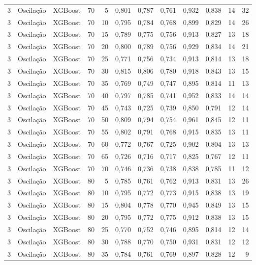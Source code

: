 \begin{longtable}{ccclrrrrrrrr}
3 & Oscilação & XGBoost & 70 & 5 & 0,801 & 0,787 & 0,761 & 0,932 & 0,838 & 14 & 32 \\
3 & Oscilação & XGBoost & 70 & 10 & 0,795 & 0,784 & 0,768 & 0,899 & 0,829 & 14 & 26 \\
3 & Oscilação & XGBoost & 70 & 15 & 0,789 & 0,775 & 0,756 & 0,913 & 0,827 & 13 & 18 \\
3 & Oscilação & XGBoost & 70 & 20 & 0,800 & 0,789 & 0,756 & 0,929 & 0,834 & 14 & 21 \\
3 & Oscilação & XGBoost & 70 & 25 & 0,771 & 0,756 & 0,734 & 0,913 & 0,814 & 13 & 18 \\
3 & Oscilação & XGBoost & 70 & 30 & 0,815 & 0,806 & 0,780 & 0,918 & 0,843 & 13 & 15 \\
3 & Oscilação & XGBoost & 70 & 35 & 0,769 & 0,749 & 0,747 & 0,895 & 0,814 & 11 & 13 \\
3 & Oscilação & XGBoost & 70 & 40 & 0,797 & 0,785 & 0,741 & 0,952 & 0,833 & 14 & 14 \\
3 & Oscilação & XGBoost & 70 & 45 & 0,743 & 0,725 & 0,739 & 0,850 & 0,791 & 12 & 14 \\
3 & Oscilação & XGBoost & 70 & 50 & 0,809 & 0,794 & 0,754 & 0,961 & 0,845 & 12 & 11 \\
3 & Oscilação & XGBoost & 70 & 55 & 0,802 & 0,791 & 0,768 & 0,915 & 0,835 & 13 & 11 \\
3 & Oscilação & XGBoost & 70 & 60 & 0,772 & 0,767 & 0,725 & 0,902 & 0,804 & 13 & 13 \\
3 & Oscilação & XGBoost & 70 & 65 & 0,726 & 0,716 & 0,717 & 0,825 & 0,767 & 12 & 11 \\
3 & Oscilação & XGBoost & 70 & 70 & 0,746 & 0,736 & 0,738 & 0,838 & 0,785 & 11 & 12 \\
3 & Oscilação & XGBoost & 80 & 5 & 0,785 & 0,761 & 0,762 & 0,913 & 0,831 & 13 & 26 \\
3 & Oscilação & XGBoost & 80 & 10 & 0,795 & 0,772 & 0,773 & 0,915 & 0,838 & 13 & 19 \\
3 & Oscilação & XGBoost & 80 & 15 & 0,804 & 0,778 & 0,770 & 0,945 & 0,849 & 13 & 15 \\
3 & Oscilação & XGBoost & 80 & 20 & 0,795 & 0,772 & 0,775 & 0,912 & 0,838 & 13 & 15 \\
3 & Oscilação & XGBoost & 80 & 25 & 0,770 & 0,752 & 0,746 & 0,895 & 0,814 & 12 & 14 \\
3 & Oscilação & XGBoost & 80 & 30 & 0,788 & 0,770 & 0,750 & 0,931 & 0,831 & 12 & 12 \\
3 & Oscilação & XGBoost & 80 & 35 & 0,784 & 0,761 & 0,769 & 0,897 & 0,828 & 12 & 9 \\

\end{longtable}
